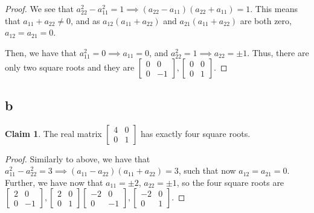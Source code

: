 \documentclass[12pt,letterpaper]{article}
\theoremstyle{definition}
\newtheorem*{claim}{Claim}
\begin{document}
\begin{proof}
 We see that $a_{22}^2 - a_{11}^2 = 1 \implies (a_{22} - a_{11})(a_{22} + a_{11})
 = 1$. This means that $a_{11} + a_{22} \neq 0$, and as $a_{12}(a_{11} +
 a_{22})$ and  $a_{21}(a_{11} + a_{22})$ are both zero, $a_{12} = a_{21} = 0$.

 Then, we have that $a_{11}^2 = 0 \implies a_{11} = 0$, and $a_{22}^2 = 1
 \implies a_{22} = \pm 1$. Thus, there are only two square roots and they are $
 \begin{bmatrix}
   0 & 0 \\
   0 & -1
 \end{bmatrix},
 \begin{bmatrix}
   0 & 0 \\
   0 & 1
 \end{bmatrix}
$.
\end{proof}

\subsection*{b}

\begin{claim}
  The real matrix $
  \begin{bmatrix}
    4 & 0 \\
    0 & 1
  \end{bmatrix}
  $ has exactly four square roots.
\end{claim}

\begin{proof}
  Similarly to above, we have that $a_{11}^2 - a_{22}^2 = 3 \implies (a_{11} - a_{22})(a_{11} + a_{22})
  = 3$, such that now $a_{12} = a_{21} = 0$. Further, we have now that $a_{11} =
  \pm 2$, $a_{22} = \pm1$, so the four square roots are$
  \begin{bmatrix}
    2 & 0 \\
    0 & -1
  \end{bmatrix},
  \begin{bmatrix}
    2 & 0 \\
    0 & 1
  \end{bmatrix}
  \begin{bmatrix}
    -2 & 0 \\
    0 & -1
  \end{bmatrix},
  \begin{bmatrix}
    -2 & 0 \\
    0 & 1
  \end{bmatrix}
  $.
\end{proof}
\end{document}
